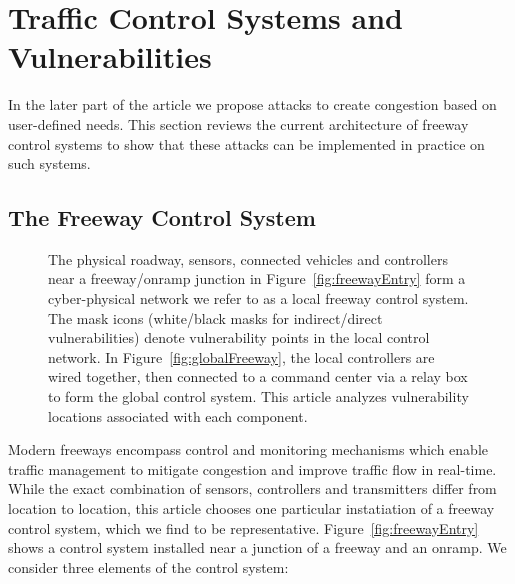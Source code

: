 \section{Traffic Control Systems and Vulnerabilities}

In the later part of the article we propose attacks to create congestion based on user-defined needs. This section reviews the current architecture of freeway control systems to show that these attacks can be implemented in practice on such systems.

	\subsection{The Freeway Control System}
	\label{sub:freeway-control-system}

	\begin{figure}

	\hfill
	\caption{The physical roadway, sensors, connected vehicles and controllers near a freeway/onramp junction in Figure~\ref{fig:freewayEntry} form a cyber-physical network we refer to as a local freeway control system. The mask icons (white/black masks for indirect/direct vulnerabilities) denote vulnerability points in the local control network.  In Figure~\ref{fig:globalFreeway}, the local controllers are wired together, then connected to a command center via a relay box to form the global control system. This article analyzes vulnerability locations associated with each component.}
	\end{figure}
    		Modern freeways encompass control and monitoring mechanisms which enable traffic management to mitigate congestion and improve traffic flow in real-time. While the exact combination of sensors, controllers and transmitters differ from location to location, this article chooses one particular instatiation of a freeway control system, which we find to be representative. Figure~\ref{fig:freewayEntry} shows a control system installed near a junction of a freeway and an onramp. We consider three elements of the control system:
